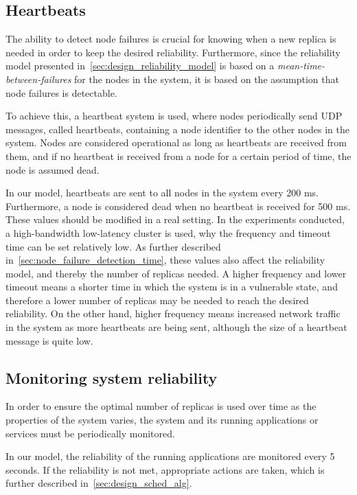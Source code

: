 \documentclass{cslthse-msc}
\begin{document}
\subsection{Heartbeats} \label{subsec:heartbeats}
The ability to detect node failures is crucial for knowing when a new replica is needed in order to keep the desired reliability. Furthermore, since the reliability model presented in~\cref{sec:design_reliability_model} is based on a \emph{mean-time-between-failures} for the nodes in the system, it is based on the assumption that node failures is detectable. 

To achieve this, a heartbeat system is used, where nodes periodically send UDP messages, called heartbeats, containing a node identifier to the other nodes in the system. Nodes are considered operational as long as heartbeats are received from them, and if no heartbeat is received from a node for a certain period of time, the node is assumed dead.

In our model, heartbeats are sent to all nodes in the system every 200 ms. Furthermore, a node is considered dead when no heartbeat is received for 500 ms. These values should be modified in a real setting. In the experiments conducted, a high-bandwidth low-latency cluster is used, why the frequency and timeout time can be set relatively low. As further described in~\cref{sec:node_failure_detection_time}, these values also affect the reliability model, and thereby the number of replicas needed. A higher frequency and lower timeout means a shorter time in which the system is in a vulnerable state, and therefore a lower number of replicas may be needed to reach the desired reliability. On the other hand, higher frequency means increased network traffic in the system as more heartbeats are being sent, although the size of a heartbeat message is quite low. %

\subsection{Monitoring system reliability} \label{subsec:monitoring_system_rel}
In order to ensure the optimal number of replicas is used over time as the properties of the system varies, the system and its running applications or services must be periodically monitored. 

In our model, the reliability of the running applications are monitored every 5 seconds. If the reliability is not met, appropriate actions are taken, which is further described in~\cref{sec:design_sched_alg}.
\end{document}
